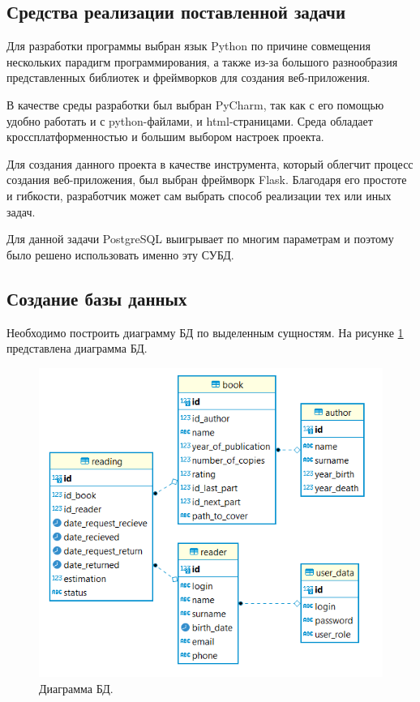 \subsection{Средства реализации поставленной задачи}
Для разработки программы выбран язык Python по причине совмещения нескольких парадигм программирования, а также из-за большого разнообразия представленных библиотек и фреймворков для создания веб-приложения.

В качестве среды разработки был выбран PyCharm, так как с его помощью удобно работать и с python-файлами, и html-страницами. Среда обладает кроссплатформенностью и большим выбором настроек проекта.

Для создания данного проекта в качестве инструмента, который облегчит процесс создания веб-приложения, был выбран фреймворк Flask. Благодаря его простоте и гибкости, разработчик может сам выбрать способ реализации тех или иных задач.

Для данной задачи PostgreSQL\cite{psql} выигрывает по многим параметрам и поэтому было решено использовать именно эту СУБД.

\subsection{Создание базы данных}
Необходимо построить диаграмму БД по выделенным сущностям. На рисунке \ref{img:DB} представлена диаграмма БД.
\begin{figure}[h!]
	\centering
	\includegraphics[scale=1]{img/DB.png}
	\caption{Диаграмма БД.}
	\label{img:DB}
\end{figure}
\newpage
